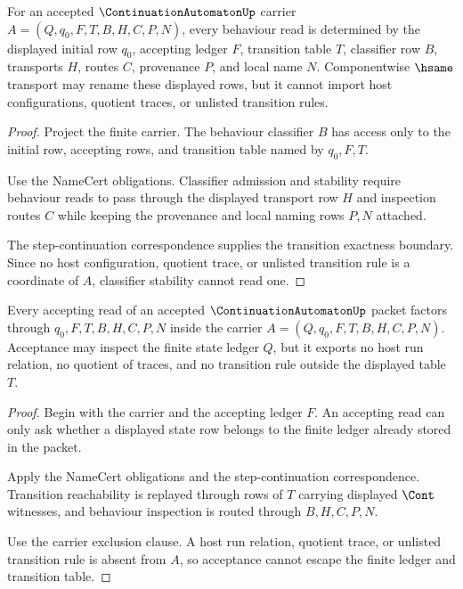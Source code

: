 \begin{theorem}
\label{thm:continuation-automaton-behaviour-classifier-stability}
For an accepted $\ContinuationAutomatonUp$ carrier $A=(Q,q_0,F,T,B,H,C,P,N)$, every behaviour read is determined by the displayed initial row $q_0$, accepting ledger $F$, transition table $T$, classifier row $B$, transports $H$, routes $C$, provenance $P$, and local name $N$. Componentwise $\hsame$ transport may rename these displayed rows, but it cannot import host configurations, quotient traces, or unlisted transition rules.
\end{theorem}
\begin{proof}
Project the finite carrier. The behaviour classifier $B$ has access only to the initial row, accepting rows, and transition table named by $q_0,F,T$.

Use the NameCert obligations. Classifier admission and stability require behaviour reads to pass through the displayed transport row $H$ and inspection routes $C$ while keeping the provenance and local naming rows $P,N$ attached.

The step-continuation correspondence supplies the transition exactness boundary. Since no host configuration, quotient trace, or unlisted transition rule is a coordinate of $A$, classifier stability cannot read one.
\end{proof}

\begin{theorem}
\label{thm:continuation-automaton-acceptance-nonescape}
Every accepting read of an accepted $\ContinuationAutomatonUp$ packet factors through $q_0,F,T,B,H,C,P,N$ inside the carrier $A=(Q,q_0,F,T,B,H,C,P,N)$. Acceptance may inspect the finite state ledger $Q$, but it exports no host run relation, no quotient of traces, and no transition rule outside the displayed table $T$.
\end{theorem}
\begin{proof}
Begin with the carrier and the accepting ledger $F$. An accepting read can only ask whether a displayed state row belongs to the finite ledger already stored in the packet.

Apply the NameCert obligations and the step-continuation correspondence. Transition reachability is replayed through rows of $T$ carrying displayed $\Cont$ witnesses, and behaviour inspection is routed through $B,H,C,P,N$.

Use the carrier exclusion clause. A host run relation, quotient trace, or unlisted transition rule is absent from $A$, so acceptance cannot escape the finite ledger and transition table.
\end{proof}


